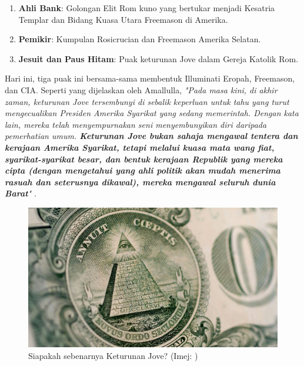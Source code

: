 \documentclass[10pt,twocolumn,letterpaper]{article}
\begin{document}
\begin{flushleft}
\begin{enumerate}
    \item \textbf{Ahli Bank}: Golongan Elit Rom kuno yang bertukar menjadi Kesatria Templar dan Bidang Kuasa Utara Freemason di Amerika.
    \item \textbf{Pemikir}: Kumpulan Rosicrucian dan Freemason Amerika Selatan.
    \item \textbf{Jesuit dan Paus Hitam}: Puak keturunan Jove dalam Gereja Katolik Rom.
\end{enumerate}
\end{flushleft}
Hari ini, tiga puak ini bersama-sama membentuk Illuminati Eropah, Freemason, dan CIA. Seperti yang dijelaskan oleh Amallulla, \textit{"Pada masa kini, di akhir zaman, keturunan Jove tersembunyi di sebalik keperluan untuk tahu yang turut mengecualikan Presiden Amerika Syarikat yang sedang memerintah. Dengan kata lain, mereka telah menyempurnakan seni menyembunyikan diri daripada pemerhatian umum. \textbf{Keturunan Jove bukan sahaja mengawal tentera dan kerajaan Amerika Syarikat, tetapi melalui kuasa mata wang fiat, syarikat-syarikat besar, dan bentuk kerajaan Republik yang mereka cipta (dengan mengetahui yang ahli politik akan mudah menerima rasuah dan seterusnya dikawal), mereka mengawal seluruh dunia Barat}"} \cite{33,34}.

\begin{figure}[t]
\begin{center}
   \includegraphics[width=1\linewidth]{illuminati.jpg}
\end{center}
   \caption{Siapakah sebenarnya Keturunan Jove? (Imej: \cite{35})}
\label{fig:10}
\label{fig:onecol}
\end{figure}
\end{document}
